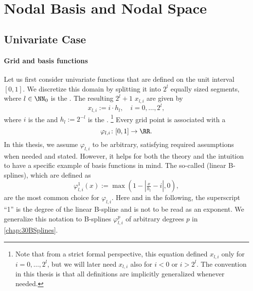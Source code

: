\section{Nodal Basis and Nodal Space}
\label{sec:21nodalSpaces}

\subsection{Univariate Case}

\paragraph{Grid and basis functions}

Let us first consider univariate functions
that are defined on the unit interval $[0, 1]$.
%
%
%
We discretize this domain by splitting it into $2^l$ equally sized segments,
where $l \in \NN_0$ is the .
%
%
%
The resulting $2^l + 1$  $x_{l,i}$ are given by
\begin{equation}
  x_{l,i} := i \cdot h_l,\quad
  i = 0, \dotsc, 2^l,
\end{equation}
where $i$ is the  and $h_l := 2^{-l}$ is the .%
\footnote{%
  Note that from a strict formal perspective,
  this equation defined $x_{l,i}$ only for $i = 0, \dotsc, 2^l$,
  but we will later need $x_{l,i}$ also for $i < 0$ or $i > 2^l$.
  The convention in this thesis is that all definitions are
  implicitly generalized whenever needed.%
}
%
Every grid point is associated with a 
\begin{equation}
  \varphi_{l,i}\colon [0, 1] \to \RR.
\end{equation}
In this thesis, we assume $\varphi_{l,i}$ to be arbitrary,
satisfying required assumptions when needed and stated.
However, it helps for both the theory and the intuition to have a
specific example of basis functions in mind.
%
The so-called  (linear B-splines), which are defined as
\begin{equation}
  \label{eq:hatFunctionUV}
  \varphi_{l,i}^1(x)
  := \max(1 - |\tfrac{x}{h_l} - i|, 0),
\end{equation}
are the most common choice for $\varphi_{l,i}$.
Here and in the following,
the superscript ``1'' is the degree of the linear B-spline and
is not to be read as an exponent.
We generalize this notation to B-splines $\varphi_{l,i}^p$ of
arbitrary degrees $p$ in \cref{chap:30BSplines}.

